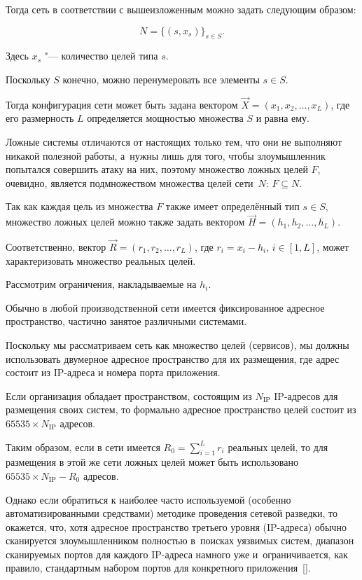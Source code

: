 Тогда сеть в соответствии с вышеизложенным можно задать следующим образом: 

$$

N=\{(s,x_s)\}_{s \in S}. 

$$

Здесь $x_s$ "--- количество целей типа $s$. 



Поскольку $S$ конечно, можно перенумеровать все элементы $s \in S$. 

Тогда конфигурация сети может быть задана вектором $\vec{X}=(x_1, x_2, \dots, x_L)$, где его размерность $L$ определяется мощностью множества $S$ и равна ему.



Ложные системы отличаются от настоящих только тем, что они не выполняют никакой полезной работы, а~нужны лишь для того, чтобы злоумышленник попытался совершить атаку на них, поэтому множество ложных целей $F$, очевидно, является подмножеством множества целей сети~$N$: $F \subseteq N$. 

Так как каждая цель из множества $F$ также имеет определённый тип $s \in S$, множество ложных целей можно также задать вектором \mbox{$\vec{H}=(h_1, h_2, \dots, h_L)$.} 

Соответственно, вектор $\vec{R}=(r_1, r_2, \dots, r_L)$, где ${r_i=x_i-h_i}$, $i \in [1, L]$, может характеризовать множество реальных целей. 

Рассмотрим ограничения, накладываемые на $h_i$. 



Обычно в любой производственной сети имеется фиксированное адресное пространство, частично занятое различными системами. 

Поскольку мы рассматриваем сеть как множество целей (сервисов), мы должны использовать двумерное адресное пространство для их размещения, где адрес состоит из IP-адреса и номера порта приложения. 

Если организация обладает пространством, состоящим из $N_\text{IP}$ IP-адресов для размещения своих систем, то формально адресное пространство целей состоит из $65535 \times N_\text{IP}$ адресов. 

Таким образом, если в сети имеется $R_0 = \sum_{i=1}^L r_i$ реальных целей, то для размещения в этой же сети ложных целей может быть использовано \mbox{$65535 \times N_\text{IP} - R_0$} адресов. 

Однако если обратиться к наиболее часто используемой (особенно автоматизированными средствами) методике проведения сетевой разведки, то окажется, что, хотя адресное пространство третьего уровня (IP-адреса) обычно сканируется злоумышленником полностью в~поисках уязвимых систем, диапазон сканируемых портов для каждого IP-адреса намного уже и~ограничивается, как правило, стандартным набором портов для конкретного приложения~[]. 

